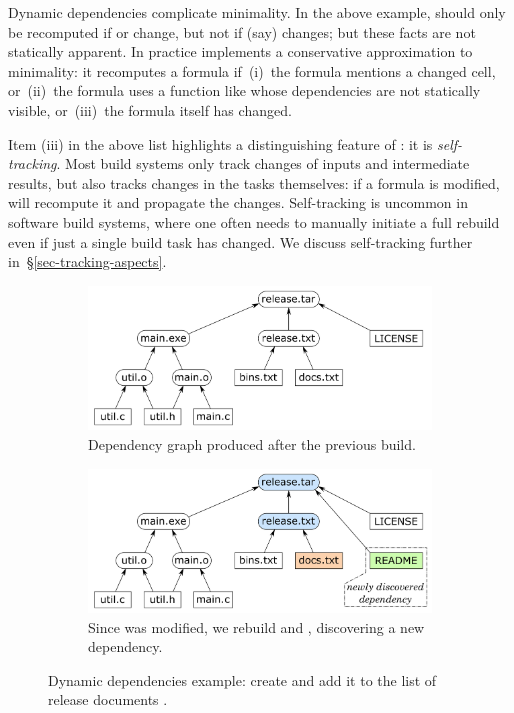 Dynamic dependencies complicate minimality.  In the above example, 
should only be recomputed if  or  change, but not if (say)
 changes; but these facts are not statically apparent. In practice
\Excel implements a conservative approximation to minimality: it recomputes a
formula if~(i)~the formula mentions a changed cell, or~(ii)~the formula uses a
function like  whose dependencies are not statically visible,
or~(iii)~the formula itself has changed.

Item (iii) in the above list highlights a distinguishing feature of \Excel: it
is \emph{self-tracking}. Most build systems only track changes of inputs and
intermediate results, but \Excel also tracks changes in the tasks themselves: if
a formula is modified, \Excel will recompute it and propagate the changes.
Self-tracking is uncommon in software build systems, where one often needs to
manually initiate a full rebuild even if just a single build task has changed.
We discuss self-tracking further in~\S\ref{sec-tracking-aspects}.

\begin{figure}[h]
\vspace{-2mm}
\begin{subfigure}[b]{0.90\linewidth}
\centerline{\includegraphics[scale=0.28]{fig/shake-example.pdf}}
\caption{Dependency graph produced after the previous build.}
\end{subfigure}
\begin{subfigure}[b]{0.90\linewidth}
\centerline{\includegraphics[scale=0.28]{fig/shake-example-rebuild.pdf}}
\caption{Since  was modified, we rebuild  and
, discovering a new dependency.}
\end{subfigure}
\vspace{-2mm}
\caption{Dynamic dependencies example: create  and add it to the
list of release documents .\label{fig-shake}}
\vspace{-4mm}
\end{figure}

